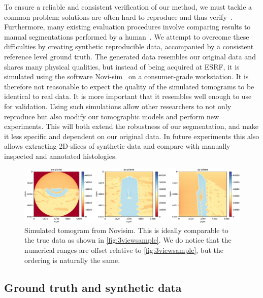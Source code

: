To ensure a reliable and consistent verification of our method, we must tackle a
common problem: solutions are often hard to reproduce and thus
verify~\cite{replication-crisis}. Furthermore, many existing evaluation
procedures involve comparing results to manual segmentations performed by a
human~\cite{seg_literature_review}. We attempt to overcome these difficulties by
creating synthetic reproducible data, accompanied by a consistent reference
level ground truth. The generated data resembles our original data and shares
many physical qualities, but instead of being acquired at ESRF, it is simulated
using the software Novi-sim~\cite{novisim} on a consumer-grade workstation. It
is therefore not reasonable to expect the quality of the simulated tomograms to
be identical to real data. It is more important that it resembles well enough
to use for validation.  Using such simulations allow other researchers to not
only reproduce but also modify our tomographic models and perform new
experiments.  This will both extend the robustness of our segmentation, and
make it less specific and dependent on our original data.  In future
experiments this also allows extracting 2D-slices of synthetic data and compare
with manually inspected and annotated histologies.

\begin{figure}
  \centering
  \includegraphics[width=\textwidth]{figures/novisim_raw_2x.pdf}
  \caption{Simulated tomogram from Novisim. This is ideally comparable to the
	true data as shown in \cref{fig:3viewsample}. We do notice that the
	numerical ranges are offset relative to \cref{fig:3viewsample}, but the
	ordering is naturally the same.}
  \label{fig:novisimraw}
\end{figure}

\subsection{Ground truth and synthetic data}

